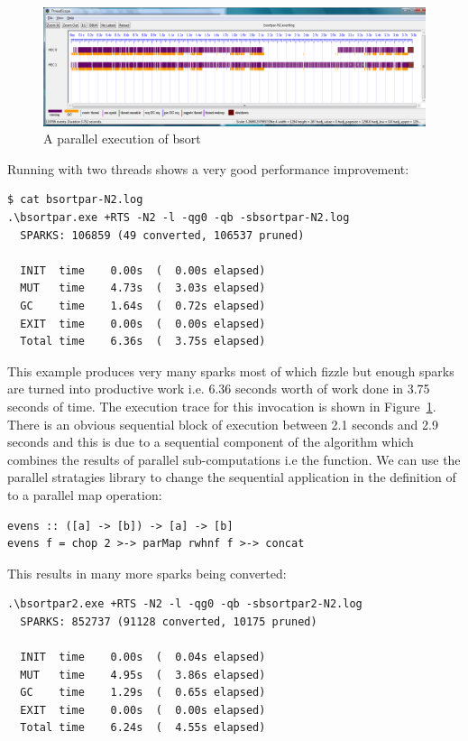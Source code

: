 \begin{figure}
\begin{center}
\includegraphics[width=17cm]{bsortpar-n2.png}
\end{center}
\caption{A parallel execution of bsort}
\label{f:bsortpar-n2}
\end{figure}

 Running with two threads shows a very good performance improvement:

\begin{verbatim}
$ cat bsortpar-N2.log
.\bsortpar.exe +RTS -N2 -l -qg0 -qb -sbsortpar-N2.log
  SPARKS: 106859 (49 converted, 106537 pruned)

  INIT  time    0.00s  (  0.00s elapsed)
  MUT   time    4.73s  (  3.03s elapsed)
  GC    time    1.64s  (  0.72s elapsed)
  EXIT  time    0.00s  (  0.00s elapsed)
  Total time    6.36s  (  3.75s elapsed)
\end{verbatim}

This example produces very many sparks most of which fizzle but enough sparks are turned into productive work i.e. 6.36 seconds worth of work done in 3.75 seconds of time. The execution trace for this invocation is shown in Figure~\ref{f:bsortpar-n2}. 
There is an obvious sequential block of execution between 2.1 seconds and 2.9 seconds and this is due to a sequential component of the algorithm which combines the results of parallel sub-computations i.e the  function. We can use the parallel stratagies library to change the sequential application in the definition of  to a parallel map operation:

\begin{lstlisting}
evens :: ([a] -> [b]) -> [a] -> [b]
evens f = chop 2 >-> parMap rwhnf f >-> concat
\end{lstlisting}

This results in many more sparks being converted:

\begin{lstlisting}
.\bsortpar2.exe +RTS -N2 -l -qg0 -qb -sbsortpar2-N2.log
  SPARKS: 852737 (91128 converted, 10175 pruned)

  INIT  time    0.00s  (  0.04s elapsed)
  MUT   time    4.95s  (  3.86s elapsed)
  GC    time    1.29s  (  0.65s elapsed)
  EXIT  time    0.00s  (  0.00s elapsed)
  Total time    6.24s  (  4.55s elapsed)
\end{lstlisting}

